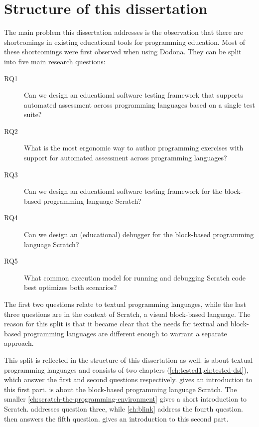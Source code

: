 \documentclass[../main]{subfiles}
\begin{document}
\section{Structure of this dissertation}\label{sec:a-note-on-the-structure-of-this-thesis}

The main problem this dissertation addresses is the observation that there are shortcomings in existing educational tools for programming education.
Most of these shortcomings were first observed when using Dodona.
They can be split into five main research questions:

\begin{description}
    \item[RQ1] Can we design an educational software testing framework that supports automated assessment across programming languages based on a single test suite?
    \item[RQ2] What is the most ergonomic way to author programming exercises with support for automated assessment across programming languages?
    \item[RQ3] Can we design an educational software testing framework for the block-based programming language Scratch?
    \item[RQ4] Can we design an (educational) debugger for the block-based programming language Scratch?
    \item[RQ5] What common execution model for running and debugging Scratch code best optimizes both scenarios?
\end{description}

The first two questions relate to textual programming languages, while the last three questions are in the context of Scratch, a visual block-based language.
The reason for this split is that it became clear that the needs for textual and block-based programming languages are different enough to warrant a separate approach.

This split is reflected in the structure of this dissertation as well.
 is about textual programming languages and consists of two chapters (\cref{ch:tested1,ch:tested-dsl}), which answer the first and second questions respectively.
 gives an introduction to this first part.
 is about the block-based programming language Scratch.
The smaller \cref{ch:scratch-the-programming-environment} gives a short introduction to Scratch.
 addresses question three, while \cref{ch:blink} address the fourth question.
 then answers the fifth question.
 gives an introduction to this second part.
\end{document}
